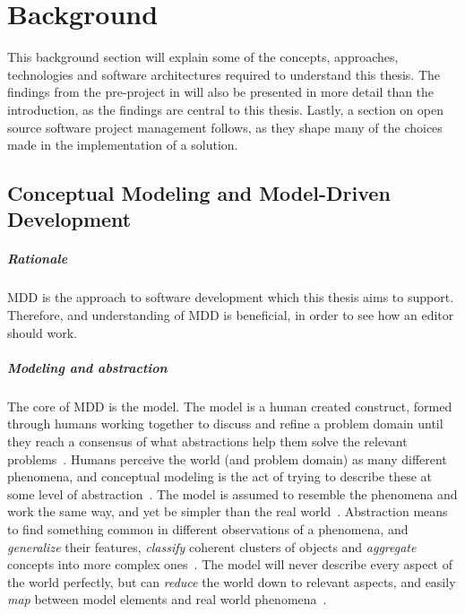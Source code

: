 \chapter{Background}\label{chap:background}

This background section will explain some of the concepts, approaches, technologies and software architectures required to understand this thesis.
The findings from the pre-project in \cite{rekstadModelingEnvironmentCloud2020} will also be presented in more detail than the introduction, as the findings are central to this thesis.
Lastly, a section on open source software project management follows, as they shape many of the choices made in the implementation of a solution.

\section{Conceptual Modeling and Model-Driven Development}

\paragraph{Rationale}
\Acrfull{MDD} is the approach to software development which this thesis aims to support.
Therefore, and understanding of \acrshort{MDD} is beneficial, in order to see how an editor should work.

\paragraph{Modeling and abstraction}
The core of \acrshort{MDD} is the model.
The model is a human created construct, formed through humans working together to discuss and refine a problem domain until they reach a consensus of what abstractions help them solve the relevant problems~\cite[p.~154]{brambillaModeldrivenSoftwareEngineering2012}.
Humans perceive the world (and problem domain) as many different phenomena, and conceptual modeling is the act of trying to describe these at some level of abstraction~\cite[p.~1,408]{krogstieModelbasedDevelopmentEvolution2012}.
The model is assumed to resemble the phenomena and work the same way, and yet be simpler than the real world~\cite[p.~414]{krogstieModelbasedDevelopmentEvolution2012}.
Abstraction means to find something common in different observations of a phenomena, and \textit{generalize} their features, \textit{classify} coherent clusters of objects and \textit{aggregate} concepts into more complex ones~\cite[p.~1]{brambillaModeldrivenSoftwareEngineering2012}.
The model will never describe every aspect of the world perfectly, but can \textit{reduce} the world down to relevant aspects, and easily \textit{map} between model elements and real world phenomena~\cite[p.~1-2]{brambillaModeldrivenSoftwareEngineering2012}.


